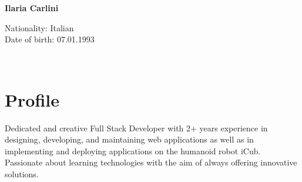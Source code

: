 \documentclass[a4paper,10pt]{article}
\begin{document}
\thispagestyle{empty}

\begin{adjustbox}{valign=t}
\begin{minipage}{0.3\textwidth} %
\begin{center}

\MySkip 	%

{\LARGE \bfseries Ilaria Carlini}

\MySkip 	%

Nationality: Italian\\
Date of birth: 07.01.1993

\MySkip 	%

\textcolor{ColorTwo}{\faEnvelopeO} 
 \\

\textcolor{ColorTwo}{\faGithub} 

\textcolor{ColorTwo}{\faLinkedin} 
\end{center}

\vfill

\section*{Profile}
Dedicated and creative Full Stack Developer with 2+ years experience in designing, developing, and maintaining web applications as well as in implementing and deploying applications on the humanoid robot iCub. Passionate about learning technologies with the aim of always offering innovative solutions.


\end{minipage}
\end{adjustbox}
\end{document}
